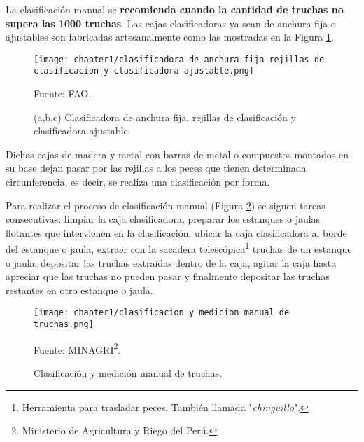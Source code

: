 La clasificación manual se \textbf{recomienda cuando la cantidad de truchas no supera las 1000 truchas}.\citep[p.~25]{FAO2014} Las cajas clasificadoras ya sean de anchura fija o ajustables son fabricadas artesanalmente como las mostradas en la Figura \ref{fig:clasificadora de anchura fija rejillas de clasificacion y clasificadora ajustable}.

\begin{figure}[H]
	\centering
	\texttt{[image: chapter1/clasificadora de anchura fija rejillas de clasificacion y clasificadora ajustable.png]}
	\caption{(a,b,c) Clasificadora de anchura fija, rejillas de clasificación y clasificadora ajustable.}
	\begin{myflushleftportland}
		Fuente: FAO.
	\end{myflushleftportland}	
	\label{fig:clasificadora de anchura fija rejillas de clasificacion y clasificadora ajustable}
\end{figure}

Dichas cajas de madera y metal con barras de metal o compuestos montados en su base dejan pasar por las rejillas a los peces que tienen determinada circunferencia, es decir, se realiza una clasificación por forma.\citep[p.~15]{FAO2005}

Para realizar el proceso de clasificación manual (Figura \ref{fig:clasificacion y medicion manual de truchas}) se siguen tareas consecutivas: limpiar la caja clasificadora, preparar los estanques o jaulas flotantes que intervienen en la clasificación, ubicar la caja clasificadora al borde del estanque o jaula, extraer con la sacadera telescópica\footnote{Herramienta para trasladar peces. También llamada "\textit{chinguillo}".} truchas de un estanque o jaula, depositar las truchas extraídas dentro de la caja, agitar la caja hasta apreciar que las truchas no pueden pasar y finalmente depositar las truchas restantes en otro estanque o jaula.\\

\begin{savenotes}
	\begin{figure}[H]
		\centering
		\texttt{[image: chapter1/clasificacion y medicion manual de truchas.png]}
		\caption{Clasificación y medición manual de truchas.}
		\begin{myflushleftportland}
			Fuente: MINAGRI\footnote{Ministerio de Agricultura y Riego del Perú.}.
		\end{myflushleftportland}			
		\label{fig:clasificacion y medicion manual de truchas}
	\end{figure}
\end{savenotes}

